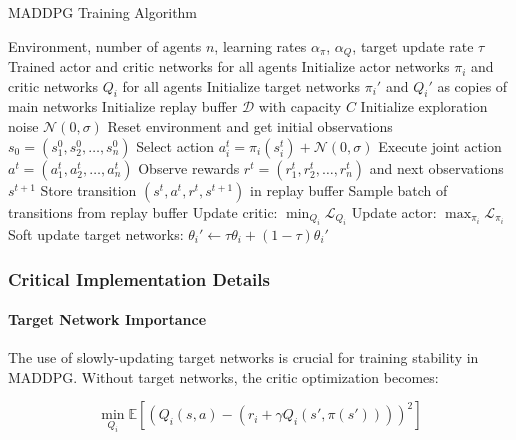\documentclass[conference]{IEEEtran}
\begin{document}
{{\begin{algorithm}[h!]
\caption{MADDPG Training Algorithm}
\begin{algorithmic}[1]
\REQUIRE Environment, number of agents $n$, learning rates $\alpha_\pi$, $\alpha_Q$, target update rate $\tau$
\ENSURE Trained actor and critic networks for all agents
\STATE Initialize actor networks $\pi_i$ and critic networks $Q_i$ for all agents
\STATE Initialize target networks $\pi_i'$ and $Q_i'$ as copies of main networks
\STATE Initialize replay buffer $\mathcal{D}$ with capacity $C$
\STATE Initialize exploration noise $\mathcal{N}(0, \sigma)$
    \STATE Reset environment and get initial observations $s_0 = (s_1^0, s_2^0, \ldots, s_n^0)$
            \STATE Select action $a_i^t = \pi_i(s_i^t) + \mathcal{N}(0, \sigma)$
        \ENDFOR
        \STATE Execute joint action $a^t = (a_1^t, a_2^t, \ldots, a_n^t)$
        \STATE Observe rewards $r^t = (r_1^t, r_2^t, \ldots, r_n^t)$ and next observations $s^{t+1}$
        \STATE Store transition $(s^t, a^t, r^t, s^{t+1})$ in replay buffer
            \STATE Sample batch of transitions from replay buffer
                \STATE Update critic: $\min_{Q_i} \mathcal{L}_{Q_i}$
                \STATE Update actor: $\max_{\pi_i} \mathcal{L}_{\pi_i}$
                \STATE Soft update target networks: $\theta_i' \leftarrow \tau\theta_i + (1-\tau)\theta_i'$
            \ENDFOR
        \ENDIF
    \ENDFOR
\ENDFOR
\end{algorithmic}
\label{alg:maddpg}
\end{algorithm}

\subsubsection{Critical Implementation Details}

\paragraph{Target Network Importance}

The use of slowly-updating target networks is crucial for training stability in MADDPG. Without target networks, the critic optimization becomes:

\begin{equation}
\min_{Q_i} \mathbb{E}[(Q_i(s,a) - (r_i + \gamma Q_i(s', \pi(s'))))^2]
\end{equation}

}}
\end{document}
